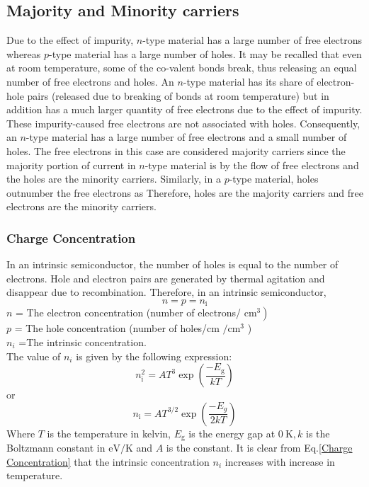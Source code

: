\subsection{Majority and Minority carriers}
Due to the effect of impurity, $n$-type material has a large number of free electrons whereas $p$-type material has a large number of holes. It may be recalled that even at room temperature, some of the co-valent bonds break, thus releasing an equal number of free electrons and holes. An $n$-type material has its share of electron-hole pairs (released due to breaking of bonds at room temperature) but in addition has a much larger quantity of free electrons due to the effect of impurity. These impurity-caused free electrons are not associated with holes. Consequently, an $n$-type material has a large number of free electrons and a small number of holes. The free electrons in this case are considered majority carriers  since the majority portion of current in $n$-type material is by the flow of free electrons  and the holes are the minority carriers. Similarly, in a $p$-type material, holes outnumber the free electrons as Therefore, holes are the majority carriers and free electrons are the minority carriers.
\subsubsection{ Charge Concentration}
In an intrinsic semiconductor, the number of holes is equal to the number of electrons. Hole and electron pairs are generated by thermal agitation and disappear due to recombination. Therefore, in an intrinsic semiconductor,
\begin{equation}
n=p=n_{\mathrm{i}}
\end{equation}
$n$ = The electron concentration (number of electrons/ $\left.\mathrm{cm}^{3}\right)$\\
$ p$ = The hole concentration (number of holes/cm $/ \mathrm{cm}^{3}$ )\\
$n_{i}$ =The intrinsic concentration.\\
The value of $n_{i}$ is given by the following expression:
\begin{equation}
n_{\mathrm{i}}^{2}=A T^{3} \exp \left(\frac{-E_{\mathrm{g}}}{k T}\right)\label{Charge Concentration}
\end{equation}
or 
\begin{equation}
n_{\mathrm{i}}=AT^{3 / 2} \exp \left(\frac{-E_{g}}{2 k T}  \right)
\end{equation}
Where $T$ is the temperature in kelvin, $E_{\mathrm{g}}$ is the energy gap at $0 \mathrm{~K}, k$ is the Boltzmann constant in $\mathrm{eV} / \mathrm{K}$ and $A$ is the constant.
It is clear from Eq.\ref{Charge Concentration} that the intrinsic concentration $n_{i}$ increases with increase in temperature.

